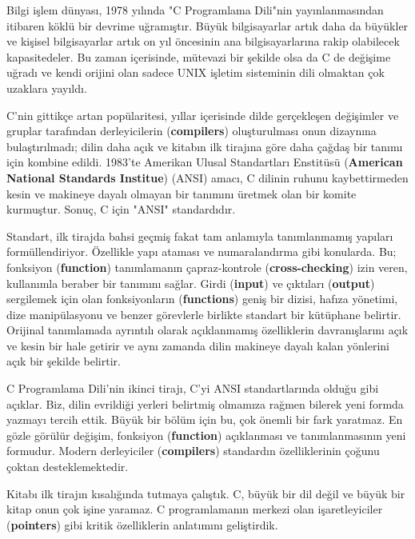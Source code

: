 \documentclass[a4paper,12pt,oneside]{book}
\begin{document}
Bilgi işlem dünyası, 1978 yılında "C Programlama Dili"nin yayınlanmasından itibaren köklü bir devrime uğramıştır. Büyük bilgisayarlar artık daha da büyükler ve kişisel bilgisayarlar artık on yıl öncesinin ana bilgisayarlarına rakip olabilecek kapasitedeler. Bu zaman içerisinde, mütevazi bir şekilde olsa da C de değişime uğradı ve kendi orijini olan sadece UNIX işletim sisteminin dili olmaktan çok uzaklara yayıldı.
\par C'nin gittikçe artan popülaritesi, yıllar içerisinde dilde gerçekleşen değişimler ve gruplar tarafından derleyicilerin (\textbf{compilers}) oluşturulması onun dizaynına bulaştırılmadı; dilin daha açık ve kitabın ilk tirajına göre daha çağdaş bir tanımı için kombine edildi. 1983'te Amerikan Ulusal Standartları Enstitüsü (\textbf{American National Standards Institue}) (ANSI) amacı, C dilinin ruhunu kaybettirmeden kesin ve makineye dayalı olmayan bir tanımını üretmek olan bir komite kurmuştur. Sonuç, C için "ANSI" standardıdır.
\par Standart, ilk tirajda bahsi geçmiş fakat tam anlamıyla tanımlanmamış yapıları formüllendiriyor. Özellikle yapı ataması ve numaralandırma gibi konularda. Bu; fonksiyon (\textbf{function}) tanımlamanın çapraz-kontrole (\textbf{cross-checking}) izin veren, kullanımla beraber bir tanımını sağlar. Girdi (\textbf{input}) ve çıktıları (\textbf{output}) sergilemek için olan fonksiyonların (\textbf{functions}) geniş bir dizisi, hafıza yönetimi, dize manipülasyonu ve benzer görevlerle birlikte standart bir kütüphane belirtir. Orijinal tanımlamada ayrıntılı olarak açıklanmamış özelliklerin davranışlarını açık ve kesin bir hale getirir ve aynı zamanda dilin makineye dayalı kalan yönlerini açık bir şekilde belirtir.
\par C Programlama Dili'nin ikinci tirajı, C'yi ANSI standartlarında olduğu gibi açıklar. Biz, dilin evrildiği yerleri belirtmiş olmamıza rağmen bilerek yeni formda yazmayı tercih ettik. Büyük bir bölüm için bu, çok önemli bir fark yaratmaz. En gözle görülür değişim, fonksiyon (\textbf{function}) açıklanması ve tanımlanmasının yeni formudur. Modern derleyiciler (\textbf{compilers}) standardın özelliklerinin çoğunu çoktan desteklemektedir.
\par Kitabı ilk tirajın kısalığında tutmaya çalıştık. C, büyük bir dil değil ve büyük bir kitap onun çok işine yaramaz. C programlamanın merkezi olan işaretleyiciler (\textbf{pointers}) gibi kritik özelliklerin anlatımını geliştirdik. \pagebreak
\end{document}
